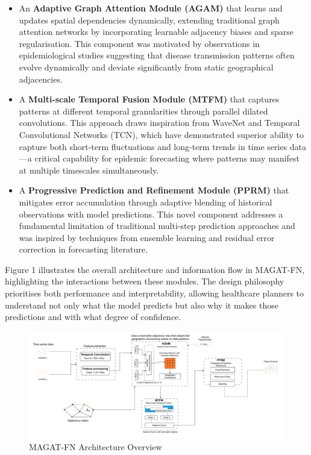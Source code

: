 \documentclass[lettersize, journal]{IEEEtran}
\begin{document}
\begin{itemize}
    \item An \textbf{Adaptive Graph Attention Module (AGAM)} that learns and updates spatial dependencies dynamically, extending traditional graph attention networks by incorporating learnable adjacency biases and sparse regularisation. This component was motivated by observations in epidemiological studies suggesting that disease transmission patterns often evolve dynamically and deviate significantly from static geographical adjacencies.
    
    \item A \textbf{Multi-scale Temporal Fusion Module (MTFM)} that captures patterns at different temporal granularities through parallel dilated convolutions. This approach draws inspiration from WaveNet and Temporal Convolutional Networks (TCN), which have demonstrated superior ability to capture both short-term fluctuations and long-term trends in time series data—a critical capability for epidemic forecasting where patterns may manifest at multiple timescales simultaneously.
    
    \item A \textbf{Progressive Prediction and Refinement Module (PPRM)} that mitigates error accumulation through adaptive blending of historical observations with model predictions. This novel component addresses a fundamental limitation of traditional multi-step prediction approaches and was inspired by techniques from ensemble learning and residual error correction in forecasting literature.
\end{itemize}

Figure 1 illustrates the overall architecture and information flow in MAGAT-FN, highlighting the interactions between these modules. The design philosophy prioritises both performance and interpretability, allowing healthcare planners to understand not only what the model predicts but also why it makes those predictions and with what degree of confidence.


\begin{figure}[ht]
\centering
\includegraphics[width=\textwidth]{../figures/GNN-architecture.pdf}
\caption{MAGAT-FN Architecture Overview}
\label{fig:architecture}
\end{figure}
\end{document}
